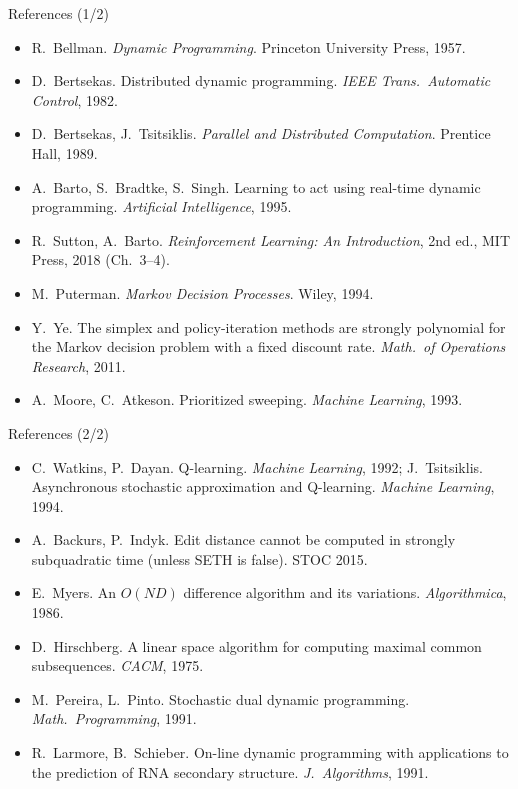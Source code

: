\begin{frame}{References (1/2)}
	\footnotesize
	\begin{itemize}
		\item R.~Bellman. \emph{Dynamic Programming}. Princeton University Press, 1957.
		\item D.~Bertsekas. Distributed dynamic programming. \emph{IEEE Trans.\ Automatic Control}, 1982.
		\item D.~Bertsekas, J.~Tsitsiklis. \emph{Parallel and Distributed Computation}. Prentice Hall, 1989.
		\item A.~Barto, S.~Bradtke, S.~Singh. Learning to act using real-time dynamic programming. \emph{Artificial Intelligence}, 1995.
		\item R.~Sutton, A.~Barto. \emph{Reinforcement Learning: An Introduction}, 2nd ed., MIT Press, 2018 (Ch.~3--4).
		\item M.~Puterman. \emph{Markov Decision Processes}. Wiley, 1994.
		\item Y.~Ye. The simplex and policy-iteration methods are strongly polynomial for the Markov decision problem with a fixed discount rate. \emph{Math.\ of Operations Research}, 2011.
		\item A.~Moore, C.~Atkeson. Prioritized sweeping. \emph{Machine Learning}, 1993.
	\end{itemize}
\end{frame}

\begin{frame}{References (2/2)}
	\footnotesize
	\begin{itemize}
		\item C.~Watkins, P.~Dayan. Q-learning. \emph{Machine Learning}, 1992; J.~Tsitsiklis. Asynchronous stochastic approximation and Q-learning. \emph{Machine Learning}, 1994.
		\item A.~Backurs, P.~Indyk. Edit distance cannot be computed in strongly subquadratic time (unless SETH is false). STOC 2015.
		\item E.~Myers. An $O(ND)$ difference algorithm and its variations. \emph{Algorithmica}, 1986.
		\item D.~Hirschberg. A linear space algorithm for computing maximal common subsequences. \emph{CACM}, 1975.
		\item M.~Pereira, L.~Pinto. Stochastic dual dynamic programming. \emph{Math.\ Programming}, 1991.
		\item R.~Larmore, B.~Schieber. On-line dynamic programming with applications to the prediction of RNA secondary structure. \emph{J.\ Algorithms}, 1991.
	\end{itemize}
\end{frame}

